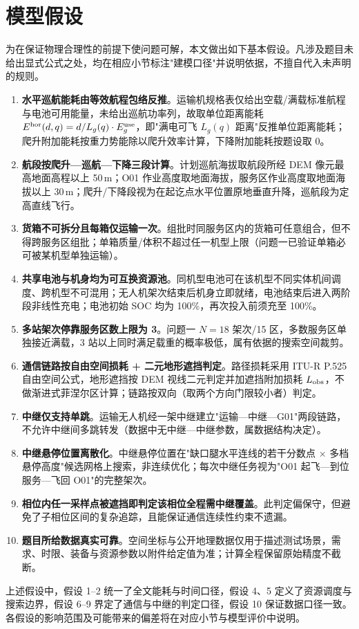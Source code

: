 \section{模型假设}

为在保证物理合理性的前提下使问题可解，本文做出如下基本假设。凡涉及题目未给出显式公式之处，均在相应小节标注"建模口径"并说明依据，不擅自代入未声明的规则。

\begin{enumerate}
    \item \textbf{水平巡航能耗由等效航程包络反推}。运输机规格表仅给出空载/满载标准航程与电池可用能量，未给出巡航功率列，故取单位距离能耗 $E^{\rm hor}(d,q)=d/L_g(q)\cdot E^{\rm use}_g$，即"满电可飞 $L_g(q)$ 距离"反推单位距离能耗；爬升附加能耗按重力势能除以爬升效率计算，下降附加能耗按题设取 0。
    \item \textbf{航段按爬升—巡航—下降三段计算}。计划巡航海拔取航段所经 DEM 像元最高地面高程以上 50\,m；O01 作业高度取地面海拔，服务区作业高度取地面海拔以上 30\,m；爬升/下降段视为在起讫点水平位置原地垂直升降，巡航段为定高直线飞行。
    \item \textbf{货箱不可拆分且每箱仅运输一次}。组批时同服务区内的货箱可任意组合，但不得跨服务区组批；单箱质量/体积不超过任一机型上限（问题一已验证单箱必可被某机型单独运输）。
    \item \textbf{共享电池与机身均为可互换资源池}。同机型电池可在该机型不同实体机间调度、跨机型不可混用；无人机架次结束后机身立即就绪，电池结束后进入两阶段非线性充电；电池初始 SOC 均为 100\%，再次投入前须充至 100\%。
    \item \textbf{多站架次停靠服务区数上限为 3}。问题一 $N=18$ 架次/15 区，多数服务区单独接近满载，3 站以上同时满足载重的概率极低，属有依据的搜索空间裁剪。
    \item \textbf{通信链路按自由空间损耗 + 二元地形遮挡判定}。路径损耗采用 ITU-R P.525 自由空间公式\cite{ref_itu}，地形遮挡按 DEM 视线二元判定并加遮挡附加损耗 $L_{\rm obs}$，不做渐进式菲涅尔区计算；链路按双向（取两个方向门限较小者）判定。
    \item \textbf{中继仅支持单跳}。运输无人机经一架中继建立"运输—中继—G01"两段链路，不允许中继间多跳转发（数据中无中继—中继参数，属数据结构决定）。
    \item \textbf{中继悬停位置离散化}。中继悬停位置在"缺口腿水平连线的若干分数点 $\times$ 多档悬停高度"候选网格上搜索，非连续优化；每次中继任务视为"O01 起飞—到位服务—飞回 O01"的完整架次。
    \item \textbf{相位内任一采样点被遮挡即判定该相位全程需中继覆盖}。此判定偏保守，但避免了子相位区间的复杂追踪，且能保证通信连续性约束不遗漏。
    \item \textbf{题目所给数据真实可靠}。空间坐标与公开地理数据仅用于描述测试场景，需求、时限、装备与资源参数以附件给定值为准；计算全程保留原始精度不截断。
\end{enumerate}

上述假设中，假设 1--2 统一了全文能耗与时间口径，假设 4、5 定义了资源调度与搜索边界，假设 6--9 界定了通信与中继的判定口径，假设 10 保证数据口径一致。各假设的影响范围及可能带来的偏差将在对应小节与模型评价中说明。
